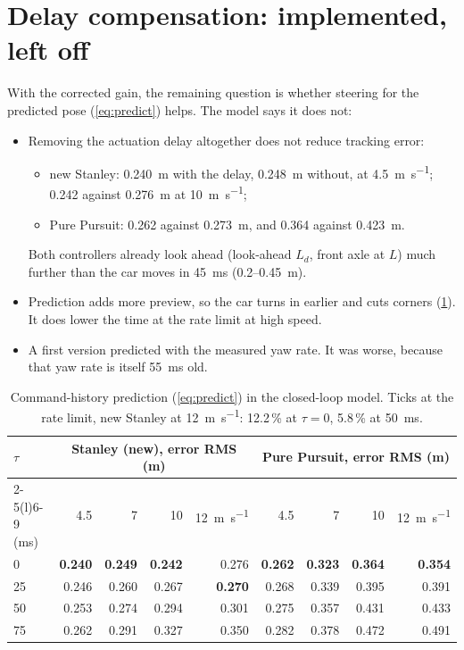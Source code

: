 \documentclass[11pt,a4paper]{article}
\begin{document}
\section{Delay compensation: implemented, left off}\label{sec:delayresult}
With the corrected gain, the remaining question is whether steering for the predicted pose
(\cref{eq:predict}) helps. The model says it does not:
\begin{itemize}
\item Removing the actuation delay altogether does not reduce tracking error:
\begin{itemize}
\item new Stanley: \SI{0.240}{\metre} with the delay, \SI{0.248}{\metre} without, at
\SI{4.5}{\metre\per\second}; \SI{0.242}{} against \SI{0.276}{\metre} at
\SI{10}{\metre\per\second};
\item Pure Pursuit: \SI{0.262}{} against \SI{0.273}{\metre}, and \SI{0.364}{} against
\SI{0.423}{\metre}.
\end{itemize}
Both controllers already look ahead (look-ahead $L_d$, front axle at $L$) much further
than the car moves in \SI{45}{\milli\second} (\SI{0.2}{}--\SI{0.45}{\metre}).
\item Prediction adds more preview, so the car turns in earlier and cuts corners
(\cref{tab:delay}). It does lower the time at the rate limit at high speed.
\item A first version predicted with the measured yaw rate. It was worse, because that
yaw rate is itself \SI{55}{\milli\second} old.
\end{itemize}

\begin{table}[h]
\centering\small
\begin{tabular}{@{}lrrrrrrrr@{}}
\toprule
$\tau$ & \multicolumn{4}{c}{Stanley (new), error RMS (m)} & \multicolumn{4}{c}{Pure Pursuit, error RMS (m)} \\
\cmidrule(lr){2-5}\cmidrule(l){6-9}
(ms) & 4.5 & 7 & 10 & \SI{12}{\metre\per\second} & 4.5 & 7 & 10 & \SI{12}{\metre\per\second} \\
\midrule
0 & \textbf{0.240} & \textbf{0.249} & \textbf{0.242} & 0.276 & \textbf{0.262} & \textbf{0.323} & \textbf{0.364} & \textbf{0.354} \\
25 & 0.246 & 0.260 & 0.267 & \textbf{0.270} & 0.268 & 0.339 & 0.395 & 0.391 \\
50 & 0.253 & 0.274 & 0.294 & 0.301 & 0.275 & 0.357 & 0.431 & 0.433 \\
75 & 0.262 & 0.291 & 0.327 & 0.350 & 0.282 & 0.378 & 0.472 & 0.491 \\
\bottomrule
\end{tabular}
\caption{Command-history prediction (\cref{eq:predict}) in the closed-loop model.
Ticks at the rate limit, new Stanley at \SI{12}{\metre\per\second}: 12.2\,\% at
$\tau=0$, 5.8\,\% at \SI{50}{\milli\second}.}
\label{tab:delay}
\end{table}
\end{document}
